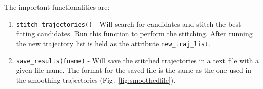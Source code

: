 \documentclass[10pt,a4paper]{article}
\begin{document}
The important functionalities are:

\begin{enumerate}
	\item \texttt{stitch\_trajectories()} - Will search for candidates and stitch the best fitting candidates. Run this function to perform the stitching. After running the new trajectory list is held as the attribute \texttt{new\_traj\_list}.
	
	\item \texttt{save\_results(fname)} - Will save the stitched trajectories in a text file with a given file name. The format for the saved file is the same as the one used in the smoothing trajectories (Fig.~\ref{fig:smoothedfile}).
\end{enumerate}







\end{document}
